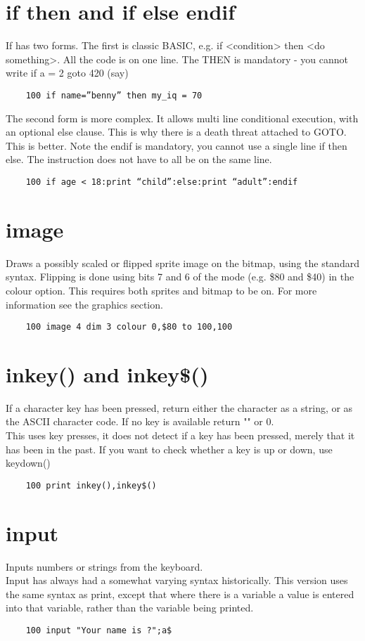\section*{if then and if else endif}
If has two forms. The first is classic BASIC, e.g. if <condition> then <do something>. All the code is on one line. The THEN is mandatory - you cannot write if a = 2 goto 420 (say)
\example{}
\begin{verbatim}
	100 if name=”benny” then my_iq = 70
\end{verbatim}
The second form is more complex. It allows multi line conditional execution, with an optional else clause. This is why there is a death threat attached to GOTO. This is better.  Note the endif is mandatory, you cannot use a single line if then else. The instruction does not have to all be on the same line.
\example{}
\begin{verbatim}
	100 if age < 18:print “child”:else:print “adult”:endif
\end{verbatim}

\section*{image}
Draws a possibly scaled or flipped sprite image on the bitmap, using the standard syntax. Flipping is done using bits 7 and 6 of the mode (e.g. \$80 and \$40) in the colour option. This requires both sprites and bitmap to be on. For more information see the graphics section.
\example{}
\begin{verbatim}
	100 image 4 dim 3 colour 0,$80 to 100,100
\end{verbatim}

\section*{inkey() and inkey\$()}
If a character key has been pressed, return either the character as a string, or as the ASCII character code. If no key is available return "" or 0.\\
This uses key presses, it does not detect if a key has been pressed, merely that it has been in the past. If you want to check whether a key is up or down, use keydown()
\example{}
\begin{verbatim}
	100 print inkey(),inkey$()
\end{verbatim}

\section*{input}
Inputs numbers or strings from the keyboard. \\
Input has always had a somewhat varying syntax historically. This version uses the same syntax as print, except that where there is a variable a value is entered into that variable, rather than the variable being printed.
\example{}
\begin{verbatim}
	100 input "Your name is ?";a$
\end{verbatim}

